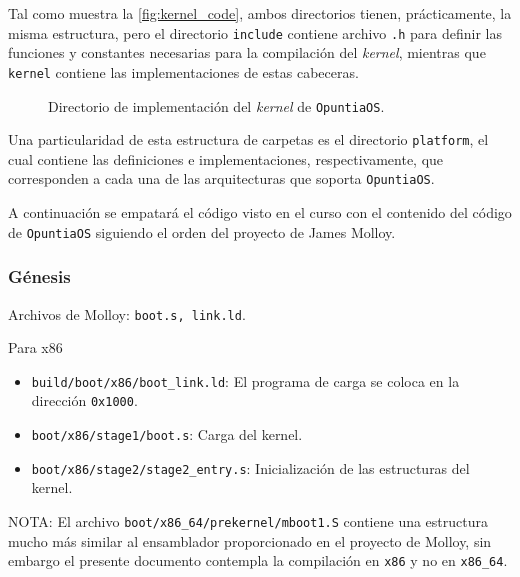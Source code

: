 	
	
	Tal como muestra la \autoref{fig:kernel_code}, ambos directorios tienen, prácticamente, la misma estructura, pero el directorio \texttt{include} contiene archivo \texttt{.h} para definir las funciones y constantes necesarias para la compilación del \textit{kernel}, mientras que \texttt{kernel} contiene las implementaciones de estas cabeceras.
	\begin{figure}[ht]
		\centering
		\hspace{3cm}
		\caption{
			Directorio de implementación del \textit{kernel} de \texttt{OpuntiaOS}.
			\label{fig:kernel_code}
		}
	\end{figure}

	
	
	Una particularidad de esta estructura de carpetas es el directorio \texttt{platform}, el cual contiene las definiciones e implementaciones, respectivamente, que corresponden a cada una de las arquitecturas que soporta \texttt{OpuntiaOS}.
	
	
	
	A continuación se empatará el código visto en el curso con el contenido del código de \texttt{OpuntiaOS} siguiendo el orden del proyecto de James Molloy.
	
	
	
	\clearpage
	\subsubsection{Génesis}
		Archivos de Molloy: \texttt{boot.s, link.ld}.
		
		Para x86
		\begin{itemize} \setlength\itemsep{0pt}
			\item \texttt{build/boot/x86/boot\_link.ld}: El programa de carga se coloca en la dirección \texttt{0x1000}.
			\item \texttt{boot/x86/stage1/boot.s}: Carga del kernel.
			\item \texttt{boot/x86/stage2/stage2\_entry.s}: Inicialización de las estructuras del kernel.
		\end{itemize}
	
		NOTA: El archivo \texttt{boot/x86\_64/prekernel/mboot1.S} contiene una estructura mucho más similar al ensamblador proporcionado en el proyecto de Molloy, sin embargo el presente documento contempla la compilación en \texttt{x86} y no en \texttt{x86\_64}.
		
